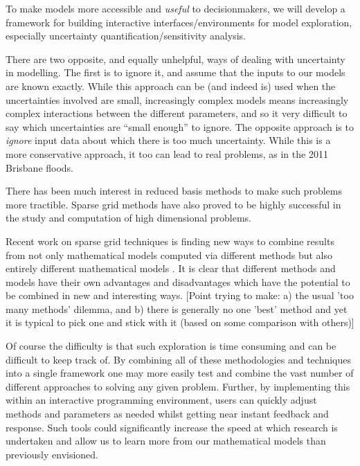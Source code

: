 \documentclass[a4paper,fontsize=12pt]{scrartcl}
\begin{document}
To make models more accessible and \emph{useful} to decisionmakers, we
will develop a framework for building interactive
interfaces/environments for model exploration, especially uncertainty
quantification/sensitivity analysis.

There are two opposite, and equally unhelpful, ways of dealing with
uncertainty in modelling. The first is to ignore it, and assume that
the inputs to our models are known exactly. While this approach can
be (and indeed is) used
when the uncertainties involved are small, increasingly complex models
means increasingly complex interactions between the different
parameters, and so it very difficult to say which uncertainties are
``small enough'' to ignore. The opposite approach is to \emph{ignore} input
data about which there is too much uncertainty. While this is a more
conservative approach, it too can lead to real problems, as in the
2011 Brisbane floods.

There has been much interest in reduced basis methods to make such
problems more tractible. Sparse grid methods
have also proved to be highly successful in the study and computation
of high dimensional problems.

Recent work on sparse grid techniques is finding new ways to
combine results from not only mathematical models computed via
different methods  but also entirely different mathematical
models . It is clear that different methods and models
have their own advantages and disadvantages which have the potential
to be combined in new and interesting ways. [Point trying to make: a)
the usual 'too many methods' dilemma, and b) there is generally no one
'best' method and yet it is typical to pick one and stick with it
(based on some comparison with others)]

Of course the difficulty is that such exploration is time consuming
and can be difficult to keep track of. By combining all of these
methodologies and techniques into a single framework one may more
easily test and combine the vast number of different approaches to
solving any given problem. Further, by implementing this within an
interactive programming environment, users can quickly adjust methods
and parameters as needed whilst getting near instant feedback and
response. Such tools could significantly increase the speed at which
research is undertaken and allow us to learn more from our
mathematical models than previously envisioned.
\end{document}

